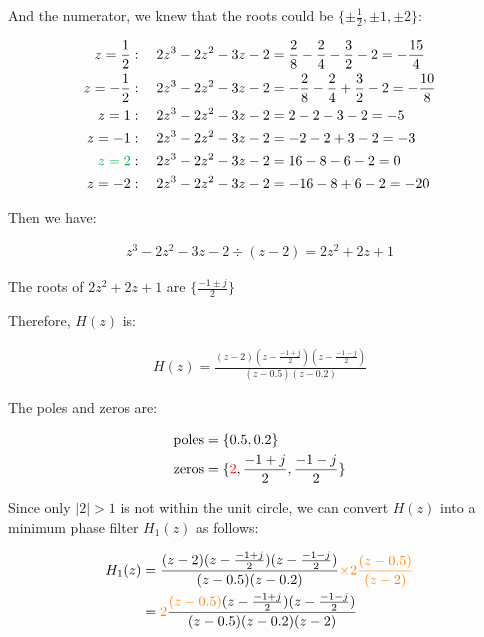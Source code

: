 \documentclass{article}
\begin{document}
And the numerator, we knew that the roots could be $\{\pm \frac{1}{2}, \pm 1, \pm 2\}$:

\begin{align*}
    z = \frac{1}{2} &: \quad 2z^3 - 2z^2 -3z - 2 = \frac{2}{8} - \frac{2}{4} - \frac{3}{2} - 2 = -\frac{15}{4} \\
    z = -\frac{1}{2} &: \quad 2z^3 - 2z^2 -3z - 2 = -\frac{2}{8} - \frac{2}{4} + \frac{3}{2} - 2 = -\frac{10}{8} \\
    z = 1 &: \quad 2z^3 - 2z^2 -3z - 2 = 2 - 2 - 3 - 2 = -5 \\
    z = -1 &: \quad 2z^3 - 2z^2 -3z - 2 = - 2 - 2 + 3 - 2 = -3 \\
    \textcolor{Green}{z = 2} &: \quad 2z^3 - 2z^2 -3z - 2 = 16 - 8 - 6 - 2 = 0 \\
    z = -2 &: \quad 2z^3 - 2z^2 -3z - 2 = -16 - 8 + 6 - 2 = -20
\end{align*}

Then we have:

\begin{align*}
    z^3 - 2z^2 -3z - 2 \div (z - 2) = 2z^2 + 2z + 1
\end{align*}

The roots of $2z^2 + 2z + 1$ are $\{\frac{-1 \pm j}{2}\}$

Therefore, $H(z)$ is:

\begin{align*}
    H(z) = \frac{(z - 2)(z - \frac{-1 + j}{2})(z - \frac{-1 - j}{2})}{(z - 0.5)(z - 0.2)} 
\end{align*}

The poles and zeros are:

\begin{align*}
    \text{poles} &= \{0.5, 0.2\} \\
    \text{zeros} &= \{\textcolor{red}{2}, \frac{-1 + j}{2}, \frac{-1 - j}{2}\}
\end{align*}

Since only $|2| > 1$ is not within the unit circle, 
we can convert $H(z)$ into a minimum phase filter $H_1(z)$ as follows:

\begin{align*}
    H_1(z) 
    &= \frac{(z - 2)(z - \frac{-1 + j}{2})(z - \frac{-1 - j}{2})}{(z - 0.5)(z - 0.2)} \textcolor{orange}{\times 2 \frac{(z - 0.5)}{(z - 2)}} \\
    &= \textcolor{orange}{2} \frac{\textcolor{orange}{(z - 0.5)}(z - \frac{-1 + j}{2})(z - \frac{-1 - j}{2})}{(z - 0.5)(z - 0.2)(z - 2)}
\end{align*}
\end{document}
